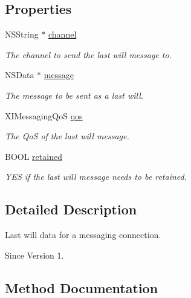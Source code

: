 \subsection*{Properties}
\begin{DoxyCompactItemize}
\item 
N\+S\+String $\ast$ \hyperlink{class_x_i_last_will_a975ae65dcc009dd717a824b1ac89e640}{channel}
\begin{DoxyCompactList}\small\item\em The channel to send the last will message to. \end{DoxyCompactList}\item 
N\+S\+Data $\ast$ \hyperlink{class_x_i_last_will_a3c0ae36d50017d963764de4aaebf78d1}{message}
\begin{DoxyCompactList}\small\item\em The message to be sent as a last will. \end{DoxyCompactList}\item 
X\+I\+Messaging\+QoS \hyperlink{class_x_i_last_will_ac5e0aeaa6a123b07a7a20dcecdc5e115}{qos}
\begin{DoxyCompactList}\small\item\em The QoS of the last will message. \end{DoxyCompactList}\item 
B\+O\+OL \hyperlink{class_x_i_last_will_a04b48606877c0bd4cbec63e394ac0807}{retained}
\begin{DoxyCompactList}\small\item\em Y\+ES if the last will message needs to be retained. \end{DoxyCompactList}\end{DoxyCompactItemize}


\subsection{Detailed Description}
Last will data for a messaging connection. 

\begin{DoxySince}{Since}
Version 1. 
\end{DoxySince}


\subsection{Method Documentation}
\hypertarget{class_x_i_last_will_ac5464f614e5d20f9ff9b0ab7623b7115}{}\label{class_x_i_last_will_ac5464f614e5d20f9ff9b0ab7623b7115} 
